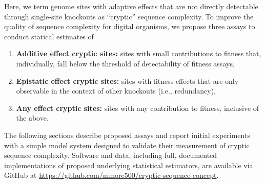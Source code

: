 



Here, we term genome sites with adaptive effects that are not directly detectable through single-site knockouts as ``cryptic'' sequence complexity.
To improve the quality of sequence complexity for digital organisms, we propose three assays to conduct statical estimates of
\begin{enumerate}
\item \textbf{Additive effect cryptic sites:} sites with small contributions to fitness that, individually, fall below the threshold of detectability of fitness assays,
\item \textbf{Epistatic effect cryptic sites:} sites with fitness effects that are only observable in the context of other knockouts (i.e., redundancy),
\item \textbf{Any effect cryptic sites:} sites with any contribution to fitness, inclusive of the above.
\end{enumerate}

The following sections describe proposed assays and report initial experiments with a simple model system designed to validate their measurement of cryptic sequence complexity.
Software and data, including full, documented implementations of proposed underlying statistical estimators, are available via GitHub at \url{https://github.com/mmore500/cryptic-sequence-concept}.
